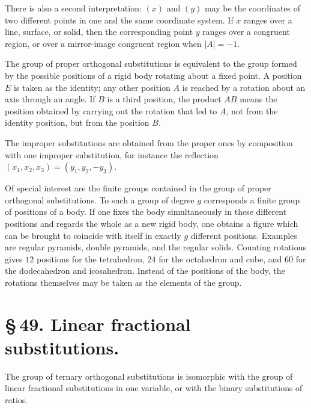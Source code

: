 \documentclass[11pt]{article}
\begin{document}
There is also a second interpretation: $(x)$ and $(y)$ may be the coordinates of two different points in one and the same coordinate system. If $x$ ranges over a line, surface, or solid, then the corresponding point $y$ ranges over a congruent region, or over a mirror-image congruent region when $|A|=-1$.

The group of proper orthogonal substitutions is equivalent to the group formed by the possible positions of a rigid body rotating about a fixed point. A position $E$ is taken as the identity; any other position $A$ is reached by a rotation about an axis through an angle. If $B$ is a third position, the product $AB$ means the position obtained by carrying out the rotation that led to $A$, not from the identity position, but from the position $B$.

The improper substitutions are obtained from the proper ones by composition with one improper substitution, for instance the reflection $(x_1,x_2,x_3)=(y_1,y_2,-y_3)$.

Of special interest are the finite groups contained in the group of proper orthogonal substitutions. To such a group of degree $g$ corresponds a finite group of positions of a body. If one fixes the body simultaneously in these different positions and regards the whole as a new rigid body, one obtains a figure which can be brought to coincide with itself in exactly $g$ different positions. Examples are regular pyramids, double pyramids, and the regular solids. Counting rotations gives $12$ positions for the tetrahedron, $24$ for the octahedron and cube, and $60$ for the dodecahedron and icosahedron. Instead of the positions of the body, the rotations themselves may be taken as the elements of the group.

\section*{\S\,49. Linear fractional substitutions.}

The group of ternary orthogonal substitutions is isomorphic with the group of linear fractional substitutions in one variable, or with the binary substitutions of ratios.
\end{document}
